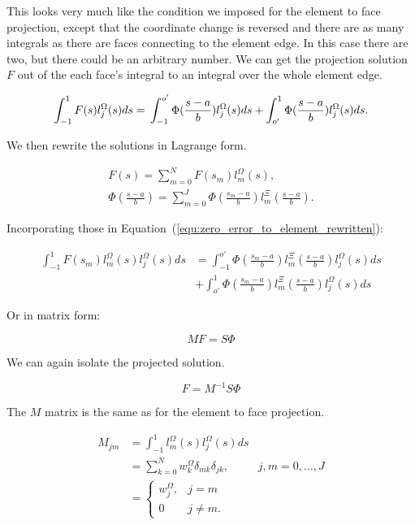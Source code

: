 This looks very much like the condition we imposed for the element to face projection, except that
the coordinate change is reversed and there are as many integrals as there are faces connecting to
the element edge. In this case there are two, but there could be an arbitrary number. We can get the
projection solution \(F\) out of the each face's integral to an integral over the whole element
edge.

\begin{equation} \label{equ:zero_error_to_element_rewritten}
	\int_{-1}^{1}F(s)l_j^\Omega(s)ds = \\
	\int_{-1}^{o'} \Phi (\frac{s -a}{b}) l_j^\Omega(s)ds + 
	\int_{o'}^{1} \Phi(\frac{s-a}{b})l_j^\Omega(s)ds.
\end{equation}

We then rewrite the solutions in Lagrange form.

\begin{gather}
	F(s) = \sum_{m = 0}^{N}F(s_m)l_m^\Omega(s), \\
	\Phi(\frac{s -a}{b}) = \sum_{m = 0}^{J}\Phi(\frac{s_m -a}{b})l_m^\Xi(\frac{s -a}{b}).
\end{gather}

Incorporating those in Equation~(\ref{equ:zero_error_to_element_rewritten}):

\begin{equation} 
	\begin{aligned}
		\int_{-1}^{1}F(s_m)l_m^\Omega(s) l_j^\Omega(s)ds &= \int_{-1}^{o'} \Phi(\frac{s_m -a}{b})l_m^\Xi(\frac{s -a}{b}) l_j^\Omega(s)ds \\
		&+ \int_{o'}^{1} \Phi(\frac{s_m -a}{b})l_m^\Xi(\frac{s -a}{b}) l_j^\Omega(s)ds
	\end{aligned}
\end{equation}

Or in matrix form:

\begin{equation} 
	MF = S \Phi
\end{equation}

We can again isolate the projected solution.

\begin{equation} 
	F = M^{-1} S \Phi
\end{equation}

The \(M\) matrix is the same as for the element to face projection.

\begin{equation} \label{equ:matrix_M_face_to_element}
	\begin{aligned}
		M_{jm} &= \int_{-1}^{1}l_m^{\Omega}(s)l_j^{\Omega}(s)ds \\
		&= \sum_{k = 0}^{N} w_k ^{\Omega} \delta_{mk}\delta_{jk}, & j, m = 0, \ldots, J \\
		&= \left \{ \begin{matrix}
			w_j^{\Omega }, & j = m \\ 
			0 & j \neq m.
			\end{matrix}\right.
	\end{aligned}
\end{equation}

